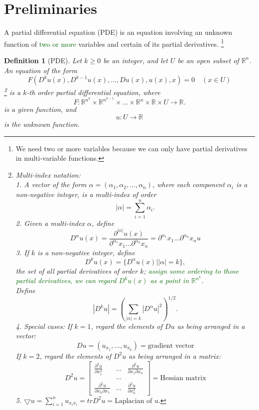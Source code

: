 \documentclass[a4paper,12pt]{report}
\newtheorem{definition}{Definition}[section]
\begin{document}
\section{Preliminaries}
A partial differential equation (PDE) is an equation involving an unknown function of \textcolor{darkgreen}{two or more} variables and certain of its partial derivatives. \footnote{We need two or more variables because we can only have partial derivatives in multi-variable functions.}\\
\begin{definition}[PDE]
Let \(k \geq 0\) be an integer, and let \(U\) be an open subset of \(\mathbb{R}^n\). An equation of the form
\[F(D^k u(x), D^{k-1} u(x), ...,  Du(x), u(x), x) = 0 \quad (x\in U)\tag{6}\]  
\footnote{Multi-index notation: \\
1. A vector of the form \(\alpha = (\alpha_1, \alpha_2, ..., \alpha_n)\), where each component \(\alpha_i\) is a non-negative integer, is a multi-index of order 
\[|\alpha| = \sum_{i=1}^n \alpha_i.\]
2. Given a multi-index \(\alpha\), define 
\[D^{\alpha}u(x) = \frac{\partial^{|\alpha|} u(x)}{\partial^{\alpha_1} x_1 ... \partial^{\alpha_n} x_n} = \partial^{\alpha_1} x_1 ... \partial^{\alpha_n} x_n u\]
3. If \(k\) is a non-negative integer, define 
\[D^k u(x) = \{D^{\alpha}u(x)||\alpha| = k\},\] the set of all partial derivatives of order \(k\); \textcolor{darkgreen}{assign some ordering to those partial derivatives, we can regard \(D^k u(x)\) as a point in \(\mathbb{R}^{n^k}\)}. \\ 
Define
\[|D^k u| = (\sum_{|\alpha| = k} |D^{\alpha} u|^2)^{1/2}.\]
4. Special cases: If \(k = 1\), regard the elements of \(Du\) as being arranged in a vector: \[Du = (u_{x_1}, ..., u_{x_k}) = \text{gradient vector}\]
If \(k = 2\), regard the elements of \(D^2 u\) as being arranged in a matrix: \[D^2 u = 
\begin{bmatrix}
    \frac{\partial^2 u}{\partial x^2_1} & ... & \frac{\partial^2 u}{\partial x_1 \partial x_n} \\
    & ... &  \\
    \frac{\partial^2 u}{\partial x_n \partial x_1} & ... & \frac{\partial^2 u}{\partial x^2_n}
\end{bmatrix} = \text{Hessian matrix}\]
5. \(\bigtriangledown u = \sum_{i = 1}^{n} u_{x_i x_i} = trD^2 u = \text{Laplacian of }u.\)
}  is a \(k\)-th order partial differential equation, where \[F: \mathbb{R}^{n^k} \times \mathbb{R}^{n^{k-1}} \times ... \times \mathbb{R}^{n} \times \mathbb{R} \times U \to \mathbb{R}. \]
is a given function, and \[u: U \to \mathbb{R}\] is the unknown function. 
\end{definition}
\end{document}
